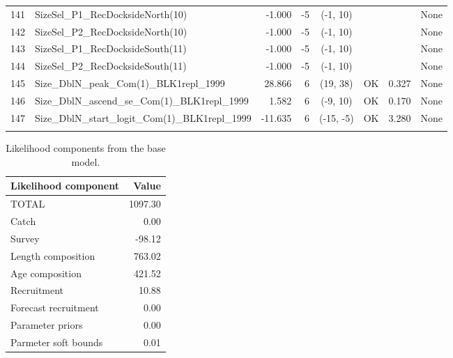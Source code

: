 \documentclass[12pt,]{article}
\begin{document}
\begin{landscape}
\begin{longtable}{rlrrcccl}
  141 & SizeSel\_P1\_RecDocksideNorth(10) & -1.000 & -5 & (-1, 10) &  &  & None \\ 
  142 & SizeSel\_P2\_RecDocksideNorth(10) & -1.000 & -5 & (-1, 10) &  &  & None \\ 
  143 & SizeSel\_P1\_RecDocksideSouth(11) & -1.000 & -5 & (-1, 10) &  &  & None \\ 
  144 & SizeSel\_P2\_RecDocksideSouth(11) & -1.000 & -5 & (-1, 10) &  &  & None \\ 
  145 & Size\_DblN\_peak\_Com(1)\_BLK1repl\_1999 & 28.866 & 6 & (19, 38) & OK & 0.327 & None \\ 
  146 & Size\_DblN\_ascend\_se\_Com(1)\_BLK1repl\_1999 & 1.582 & 6 & (-9, 10) & OK & 0.170 & None \\ 
  147 & Size\_DblN\_start\_logit\_Com(1)\_BLK1repl\_1999 & -11.635 & 6 & (-15, -5) & OK & 3.280 & None \\ 
   \hline
\hline
\label{tab:model_params}
\end{longtable}
\end{landscape}

\FloatBarrier

\begin{table}[ht]
\centering
\caption{Likelihood components from the base model.} 
\label{tab:like_components}
\begin{tabular}{lr}
  \hline
Likelihood component & Value \\ 
  \hline
TOTAL & 1097.30 \\ 
  Catch & 0.00 \\ 
  Survey & -98.12 \\ 
  Length composition & 763.02 \\ 
  Age composition & 421.52 \\ 
  Recruitment & 10.88 \\ 
  Forecast recruitment & 0.00 \\ 
  Parameter priors & 0.00 \\ 
  Parmeter soft bounds & 0.01 \\ 
   \hline
\end{tabular}
\end{table}

\newpage
\end{document}
